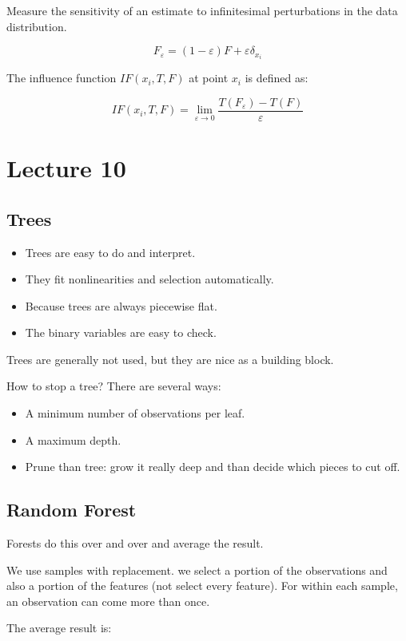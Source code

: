 \documentclass{article}
\begin{document}
Measure the sensitivity of an estimate to infinitesimal perturbations in the data distribution.

$$
F_{\varepsilon} = (1 - \varepsilon) F + \varepsilon \delta_{x_i}
$$

The influence function $IF(x_i, T, F)$ at point $x_i$ is defined as:

$$
IF(x_i, T, F) = \lim_{\varepsilon \to 0} \frac{T(F_\varepsilon) - T(F)}{\varepsilon}
$$

\section{Lecture 10}

\subsection{Trees}

\begin{itemize}
    \item Trees are easy to do and interpret.
    \item They fit nonlinearities and selection automatically.
    \item Because trees are always piecewise flat.
    \item The binary variables are easy to check.
\end{itemize}

Trees are generally not used, but they are nice as a building block.

How to stop a tree? There are several ways:
\begin{itemize}
    \item A minimum number of observations per leaf.
    \item A maximum depth.
    \item Prune than tree: grow it really deep and than decide which pieces to cut off.
\end{itemize}

\subsection{Random Forest}
Forests do this over and over and average the result.

We use samples with replacement. we select a portion of the observations and also a portion of the features (not select every feature). For within each sample, an observation can come more than once.

The average result is:
\end{document}
